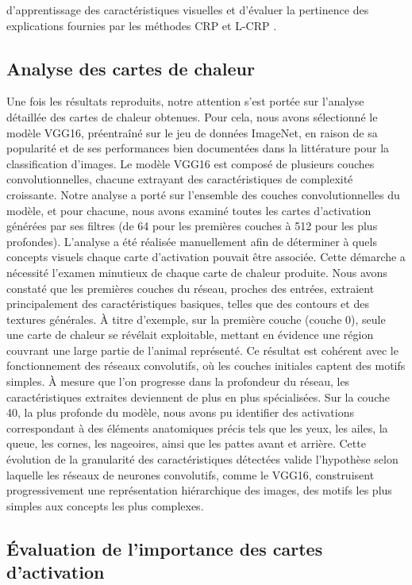 \documentclass[runningheads]{llncs}
\begin{document}
d’apprentissage des caractéristiques visuelles et d’évaluer la pertinence des explications fournies par les méthodes CRP \autocite{Achtibat2023} et L-CRP \autocite{inproceedings}.

\subsection{Analyse des cartes de chaleur}

Une fois les résultats reproduits, notre attention s'est portée sur l'analyse détaillée des cartes de chaleur obtenues. Pour cela, nous avons sélectionné le modèle VGG16, préentraîné sur le jeu de données ImageNet, en raison de sa popularité et de ses performances bien documentées dans la littérature pour la classification d'images. Le modèle VGG16 est composé de plusieurs couches convolutionnelles, chacune extrayant des caractéristiques de complexité croissante. Notre analyse a porté sur l’ensemble des couches convolutionnelles du modèle, et pour chacune, nous avons examiné toutes les cartes d’activation générées par ses filtres (de 64 pour les premières couches à 512 pour les plus profondes). L'analyse a été réalisée manuellement afin de déterminer à quels concepts visuels chaque carte d'activation pouvait être associée. Cette démarche a nécessité l'examen minutieux de chaque carte de chaleur produite. Nous avons constaté que les premières couches du réseau, proches des entrées, extraient principalement des caractéristiques basiques, telles que des contours et des textures générales. À titre d'exemple, sur la première couche (couche 0), seule une carte de chaleur se révélait exploitable, mettant en évidence une région couvrant une large partie de l'animal représenté. Ce résultat est cohérent avec le fonctionnement des réseaux convolutifs, où les couches initiales captent des motifs simples. À mesure que l'on progresse dans la profondeur du réseau, les caractéristiques extraites deviennent de plus en plus spécialisées. Sur la couche 40, la plus profonde du modèle, nous avons pu identifier des activations correspondant à des éléments anatomiques précis tels que les yeux, les ailes, la queue, les cornes, les nageoires, ainsi que les pattes avant et arrière. Cette évolution de la granularité des caractéristiques détectées valide l'hypothèse selon laquelle les réseaux de neurones convolutifs, comme le VGG16, construisent progressivement une représentation hiérarchique des images, des motifs les plus simples aux concepts les plus complexes.

\subsection{Évaluation de l'importance des cartes d'activation}
\end{document}
